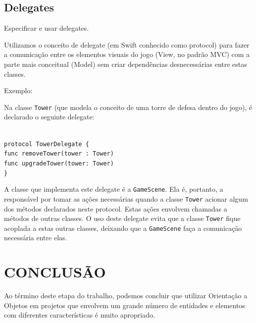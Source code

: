 \documentclass[rel_mlp]{iiufrgs}
\newcommand\tab[1][1cm]{\hspace*{#1}}
\begin{document}


\section{Delegates}

Especificar e usar delegates.

Utilizamos o conceito de delegate (em Swift conhecido como protocol) para fazer a comunicação entre os elementos visuais do jogo (View, no padrão MVC) com a parte mais conceitual (Model) sem criar dependências desnecessárias entre estas classes.

Exemplo:

Na classe \texttt{Tower} (que modela o conceito de uma torre de defesa dentro do jogo), é declarado o seguinte delegate:

\texttt{\\ protocol TowerDelegate \{\\\tab func removeTower(tower : Tower)\\\tab func upgradeTower(tower: Tower)\\\}}

A classe que implementa este delegate é a \texttt{GameScene}. Ela é, portanto, a responsável por tomar as ações necessárias quando a classe \texttt{Tower} acionar algum dos métodos declarados neste protocol. Estas ações envolvem chamadas a métodos de outras classes. O uso deste delegate evita que a classe \texttt{Tower} fique acoplada a estas outras classes, deixando que a \texttt{GameScene} faça a comunicação necessária entre elas.


%
\chapter{CONCLUSÃO}

Ao término deste etapa do trabalho, podemos concluir que utilizar Orientação a Objetos em projetos que envolvem um grande número de entidades e elementos com diferentes características é muito apropriado.
\end{document}
